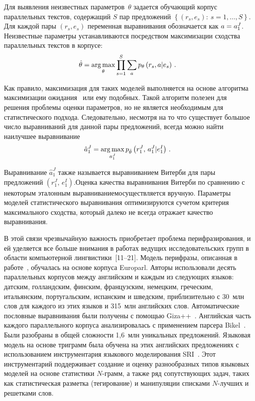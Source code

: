 \begin{multicols}{2}
     Для выявления неизвестных параметров~$\theta$ задается обучающий
корпус параллельных текстов, содержащий $S$ пар предложений $\left\{
({r}_s,{e}_s):\ s=1, \ldots ,S\right\}$. Для каждой пары
$({r}_s,{e}_s)$ переменная выравнивания обозначается как
$a\hm=a_1^J$. Неизвестные па\-ра\-мет\-ры устанавливаются посредством
максимизации сходства параллельных текстов в корпусе:
     \begin{equation*}
     \hat{\theta} = \mathop{\mathrm{arg}\,\mathrm{max}}\limits_\theta \prod\limits_{s=1}^S
\sum\limits_{{a}} p_\theta \left({r}_s, {a}\vert
{e}_s\right)\,.
     \end{equation*}

     Как правило, максимизация для таких моделей выполняется на основе
алгоритма максимизации ожидания~\cite{13-koz} или ему подобных. Такой
алгоритм полезен для решения проблемы оценки па\-ра\-мет\-ров, но не является
необходимым для статистического подхода. Следовательно, несмотря на то что
существует большое число выравниваний для данной пары предложений, всегда
можно найти наилучшее выравнивание
     \begin{equation*}
     \hat{a}_1^J=\mathop{\mathrm{arg}\,\mathrm{max}}\limits_{a_1^J} p_{\hat{\theta}}\left(  r_1^J,\,a_1^J\vert
e_1^I\right)\,.
     \end{equation*}

     Выравнивание $\hat{a}_1^J$ также называется выравниванием Витерби для
пары предложений $(r_1^J,\,e_1^I)$.\linebreak Оценка качества выравнивания Витерби по
сравнению с некоторым эталонным выравниванием\linebreak осуществляется вручную.
Параметры моделей статистического выравнивания оптимизируются с\linebreak учетом
критерия максимального сходства, который далеко не всегда отражает качество
выравнивания.

   В этой связи чрезвычайную важность приобретает проблема
перифразирования, и ей уделяется все больше внимания в работах ведущих
исследовательских групп в области компьютерной
   лингвистики~[11--21]. Модель
перифразы, описанная в работе~\cite{13-koz}, обучалась на основе корпуса
Europarl. Авторы использовали десять параллельных корпусов между английским
и каждым из следующих языков: датским, голландским, финским, французским,
немецким, греческим, италь\-ян\-ским, португальским, испанским и шведским,
приблизительно с 30~млн слов для каждого из этих языков и 315~млн английских
слов. Автоматические пословные выравнивания были получены с по\-мощью
Giza++~\cite{15-koz}. Английская часть каждого параллельного корпуса
анализировалась с применением парсера Bikel~\cite{16-koz}. Были разобраны в
общей сложности 1,6~млн уникальных предложений. Языковая модель на основе
триграмм была обучена на этих английских предложениях с использованием
инструментария языкового моделирования SRI~\cite{17-koz}. Этот
инструментарий поддерживает создание и оценку разнообразных типов языковых
моделей на основе статистики $N$-грамм, а также ряд сопутствующих задач,
таких как статистическая разметка (тегирование) и манипуляции списками
   $N$-лучших и решетками слов.


\end{multicols}
